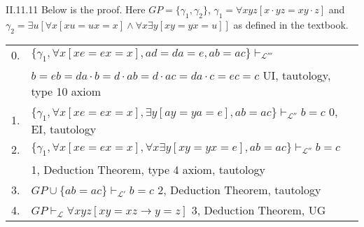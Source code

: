 \documentclass[12pt]{article}
\begin{document}
\begin{customthm}{II.11.11}
  Below is the proof. Here $GP=\{\gamma_1,\gamma_2\}$, $\gamma_1=\forall xyz[x\cdot yz=xy\cdot z]$ and $\gamma_2=\exists u[\forall x[xu=ux=x]\wedge\forall x\exists y[xy=yx=u]]$ as defined in the textbook.
  \begin{center}
    \begin{tabularx}{\textwidth}{lX}
      0. & $\{\gamma_1,\forall x[xe=ex=x],ad=da=e,ab=ac\}\vdash_{\mathcal{L}'''}$ \\
      & $b=eb=da\cdot b=d\cdot ab=d\cdot ac=da\cdot c=ec=c$ \hfill UI, tautology, type 10 axiom \\
      1. & $\{\gamma_1,\forall x[xe=ex=x],\exists y[ay=ya=e],ab=ac\}\vdash_{\mathcal{L}''}b=c$ \hfill 0, EI, tautology \\
      2. & $\{\gamma_1,\forall x[xe=ex=x],\forall x\exists y[xy=yx=e],ab=ac\}\vdash_{\mathcal{L}''}b=c$ \\
      & \hfill 1, Deduction Theorem, type 4 axiom, tautology \\
      3. & $GP\cup\{ab=ac\}\vdash_{\mathcal{L}'}b=c$ \hfill 2, Deduction Theorem, tautology \\
      4. & $GP\vdash_\mathcal{L}\forall xyz[xy=xz\rightarrow y=z]$ \hfill 3, Deduction Theorem, UG
    \end{tabularx}
  \end{center}
\end{customthm}
\end{document}
